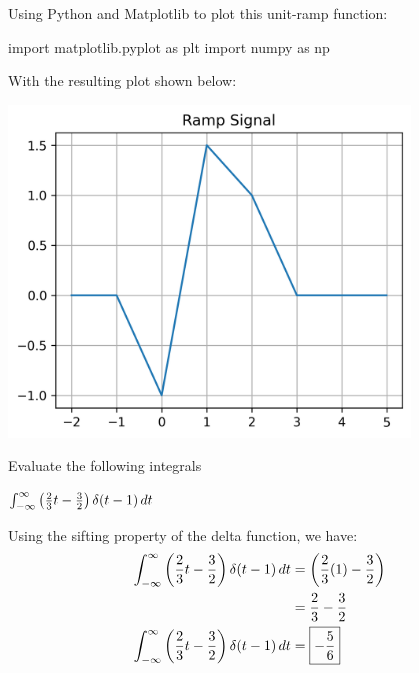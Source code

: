 \documentclass[a4paper, 10pt]{article}
\begin{document}
\begin{solution}
Using Python and Matplotlib to plot this unit-ramp function:
\begin{codingbox}
import matplotlib.pyplot as plt
import numpy as np


\end{codingbox}

With the resulting plot shown below:
\begin{center}
    \includegraphics[width=0.8\textwidth]{images/problem_8.png}
\end{center}
\end{solution}


\begin{problem}[9]
Evaluate the following integrals
\end{problem}

\begin{subproblems}
    \item \( \int_{-\infty}^{\infty} \left(\frac{2}{3}t-\frac{3}{2}\right) \delta(t-1) \,dt \)
\end{subproblems}

\begin{tosubmit}
\par\noindent\submitsolution
Using the sifting property of the delta function, we have:
\begin{align*}
    \int_{-\infty}^{\infty} \left(\frac{2}{3}t-\frac{3}{2}\right) \delta(t-1) \,dt &= \left(\frac{2}{3}(1)-\frac{3}{2}\right) \\
    &= \frac{2}{3} - \frac{3}{2} \\
    \int_{-\infty}^{\infty} \left(\frac{2}{3}t-\frac{3}{2}\right) \delta(t-1) \,dt &= \boxed{-\frac{5}{6}}
\end{align*}
\end{tosubmit}
\end{document}
